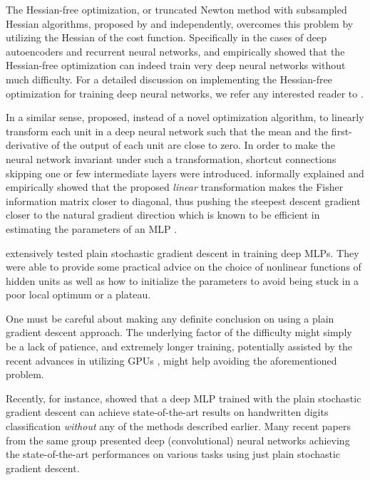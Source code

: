 \documentclass[dissertation,nocontribution]{aaltoseries}
\begin{document}
The Hessian-free optimization, or truncated Newton method with
subsampled Hessian algorithms, proposed by
\citet{Martens2010} and \citet{Byrd2011} independently,
overcomes this problem by utilizing the Hessian of the cost
function. Specifically in the cases of deep autoencoders and
recurrent neural networks, \citet{Martens2010} and
\citet{Sutskever2011} empirically showed that the
Hessian-free optimization can indeed train very deep neural
networks without much difficulty. For a detailed discussion
on implementing the Hessian-free optimization for training
deep neural networks, we refer any interested reader to
\citep{Martens2012}.

In a similar sense, \citet{Raiko2012} proposed, instead of a
novel optimization algorithm, to linearly transform each
unit in a deep neural network such that the mean and the
first-derivative of the output of each unit are close to
zero. In order to make the neural network invariant under
such a transformation, shortcut connections skipping one or
few intermediate layers were introduced. \citet{Raiko2012}
informally explained and empirically showed that the
proposed \textit{linear} transformation makes the Fisher
information matrix closer to diagonal, thus pushing the
steepest descent gradient closer to the natural gradient
direction which is known to be efficient in estimating the
parameters of an MLP \citep{Amari1998}.

\citet{Glorot2010} extensively tested plain stochastic
gradient descent in training deep MLPs. They were able to
provide some practical advice on the choice of nonlinear
functions of hidden units as well as how to initialize the
parameters to avoid being stuck in a poor
local optimum or a plateau.

One must be careful about making any definite conclusion on using
a plain gradient descent approach. The underlying factor of the
difficulty might simply be a lack of patience, and extremely
longer training, potentially assisted by the recent advances in
utilizing GPUs \citep{Raina2009}, might help avoiding the
aforementioned problem.

Recently, for instance, \citet{Ciresan2012g} showed that a
deep MLP trained with the plain stochastic gradient descent
can achieve state-of-the-art results on handwritten
digits classification \textit{without} any of the methods
described earlier. Many recent papers from the same group
\citep[see, e.g.][]{Ciresan2012c,Ciresan2012b,Ciresan2012f}
presented deep (convolutional) neural networks  achieving
the state-of-the-art performances on various tasks
using just plain stochastic gradient descent.
\end{document}
